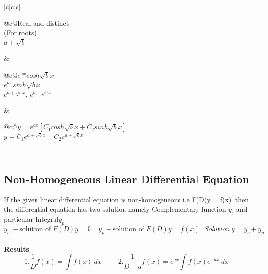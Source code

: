 \begin{table}[h!]
\begin{tabu}{|c|c|c|}
\begin{tabu}[c]{@{}c@{}}Real and distinct \\ (For roots) \\ \(a\pm\sqrt{b}\)\end{tabu} & \begin{tabu}[c]{@{}c@{}}\(e^{ax}cosh\sqrt{b}x\)\\ \(e^{ax}sinh\sqrt{b}x\)\\ \(e^{a+\sqrt{b}x}\), \(e^{a-\sqrt{b}x}\)\end{tabu} & \begin{tabu}[c]{@{}c@{}}\(y=e^{ax}[C_1cosh\sqrt{b}x+C_2sinh\sqrt{b}x]\)\\ \(y=C_1e^{a+\sqrt{b}x}+C_2e^{a-\sqrt{b}x}\)\end{tabu} \\ \hline
\end{tabu}
\end{table}

\subsection*{Non-Homogeneous Linear Differential Equation}
If the given linear differential equation is non-homogeneous i.e F(D)y = f(x), then the differential equation has two solution namely Complementary function \(y_c\) and particular Integral\(y_p\)
\[y_c\ - \text{solution of } F(D)y=0\ \ \ \ \ y_p - \text{solution of } F(D)y=f(x)\ \ \ Solution\ y=y_c+y_p \]\vspace{0.2cm}\\
\textbf{\large{Results}}\vspace{0.2cm}\\
\[1. \frac{1}{D}f(x)=\int f(x)\ dx\ \ \ \ \ \ \ \ \ \ \ 2. \frac{1}{D-a}f(x)=e^{ax}\int f(x)e^{-ax}\ dx\]

